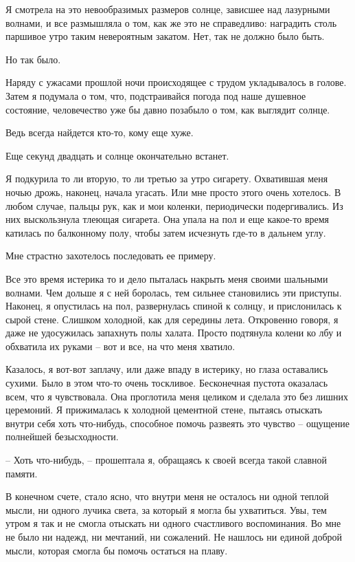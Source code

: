 \documentclass[
]{book}
\begin{document}
Я смотрела на это невообразимых размеров солнце, зависшее над лазурными волнами, и все размышляла о том, как же это не справедливо: наградить столь паршивое утро таким невероятным закатом. Нет, так не должно было быть.

Но так было.

Наряду с ужасами прошлой ночи происходящее с трудом укладывалось в голове. Затем я подумала о том, что, подстраивайся погода под наше душевное состояние, человечество уже бы давно позабыло о том, как выглядит солнце.

Ведь всегда найдется кто-то, кому еще хуже.

Еще секунд двадцать и солнце окончательно встанет.

Я подкурила то ли вторую, то ли третью за утро сигарету. Охватившая меня ночью дрожь, наконец, начала угасать. Или мне просто этого очень хотелось. В любом случае, пальцы рук, как и мои коленки, периодически подергивались. Из них выскользнула тлеющая сигарета. Она упала на пол и еще какое-то время катилась по балконному полу, чтобы затем исчезнуть где-то в дальнем углу.

Мне страстно захотелось последовать ее примеру.

Все это время истерика то и дело пыталась накрыть меня своими шальными волнами. Чем дольше я с ней боролась, тем сильнее становились эти приступы. Наконец, я опустилась на пол, развернулась спиной к солнцу, и прислонилась к сырой стене. Слишком холодной, как для середины лета. Откровенно говоря, я даже не удосужилась запахнуть полы халата. Просто подтянула колени ко лбу и обхватила их руками -- вот и все, на что меня хватило.

Казалось, я вот-вот заплачу, или даже впаду в истерику, но глаза оставались сухими. Было в этом что-то очень тоскливое. Бесконечная пустота оказалась всем, что я чувствовала. Она проглотила меня целиком и сделала это без лишних церемоний. Я прижималась к холодной цементной стене, пытаясь отыскать внутри себя хоть что-нибудь, способное помочь развеять это чувство -- ощущение полнейшей безысходности.

-- Хоть что-нибудь, -- прошептала я, обращаясь к своей всегда такой славной памяти.

В конечном счете, стало ясно, что внутри меня не осталось ни одной теплой мысли, ни одного лучика света, за который я могла бы ухватиться. Увы, тем утром я так и не смогла отыскать ни одного счастливого воспоминания. Во мне не было ни надежд, ни мечтаний, ни сожалений. Не нашлось ни единой доброй мысли, которая смогла бы помочь остаться на плаву.
\end{document}
